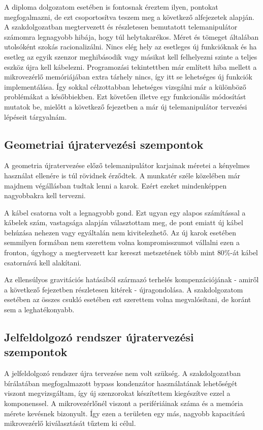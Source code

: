 A diploma dolgozatom esetében is fontosnak éreztem ilyen, pontokat megfogalmazni, de ezt csoportosítva teszem meg a következő alfejezetek alapján. A szakdolgozatban megtervezett és részletesen bemutatott telemanipulátor számomra legnagyobb hibája, hogy túl helytakarékos. Méret és tömeget általában utolsóként szokás racionalizálni. Nincs elég hely az esetleges új funkcióknak és ha esetleg az egyik szenzor meghibásodik vagy másikat kell felhelyezni szinte a teljes eszköz újra kell kábelezni. Programozási tekintettben már említett hiba mellett a mikrovezérlő memóriájában extra tárhely nincs, így itt se lehetséges új funkciók implementálása. Így sokkal célzottabban lehetséges vizsgálni már a különböző problémákat a későbbiekben. Ezt követően illetve egy funkcionális módosítást mutatok be, mielőtt a következő fejezetben a már új telemanipulátor tervezési lépéseit tárgyalnám.

\subsection{Geometriai újratervezési szempontok}

A geometria újratervezése előző telemanipulátor karjainak méretei a kényelmes használat ellenére is túl rövidnek érződtek. A munkatér széle közelében már majdnem végállásban tudtak lenni a karok. Ezért ezeket mindenképpen nagyobbakra kell tervezni.

A kábel csatorna volt a legnagyobb gond. Ezt ugyan egy alapos számítással a kábelek szám, vastagsága alapján választottam meg, de pont emiatt új kábel behúzása nehezen vagy egyáltalán nem kivitelezhető. Az új karok esetében semmilyen formában nem szerettem volna kompromisszumot vállalni ezen a fronton, úgyhogy a megtervezett kar kereszt metszetének több mint $80\%$-át kábel csatornává kell alakítani.

Az ellensúlyos gravitációs hatásából származó terhelés kompenzációjának - amiről a következő fejezetben részletesen kitérek - újragondolása. A szakdolgozatom esetében az összes csukló esetében ezt szerettem volna megvalósítani, de koránt sem a leghatékonyabb.

\subsection{Jelfeldolgozó rendszer újratervezési szempontok}

A jelfeldolgozó rendszer újra tervezése nem volt szükség. A szakdolgozatban bírálatában megfogalmazott bypass kondenzátor használatának lehetőségét viszont megvizsgáltam, így új szenzorokat készítettem kiegészítve ezzel a komponenssel. A mikrovezérlőnél viszont a perifériáinak száma és a memória mérete kevésnek bizonyult. Így ezen a területen egy más, nagyobb kapacitású mikrovezérlő kiválasztását tűztem ki célul.

